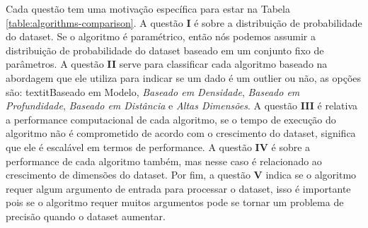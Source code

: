 Cada questão tem uma motivação específica para estar na Tabela \ref{table:algorithms-comparison}. A questão \textbf{I} é sobre a distribuição de probabilidade do dataset. Se o algoritmo é paramétrico, então nós podemos assumir a distribuição de probabilidade do dataset baseado em um conjunto fixo de parâmetros. A questão \textbf{II} serve para classificar cada algoritmo baseado na abordagem que ele utiliza para indicar se um dado é um outlier ou não, as opções são: textit{Baseado em Modelo}, \textit{Baseado em Densidade}, \textit{Baseado em Profundidade}, \textit{Baseado em Distância} e \textit{Altas Dimensões}. A questão \textbf{III} é relativa a performance computacional de cada algoritmo, se o tempo de execução do algoritmo não é comprometido de acordo com o crescimento do dataset, significa que ele é escalável em termos de performance. A questão \textbf{IV} é sobre a performance de cada algoritmo também, mas nesse caso é relacionado ao crescimento de dimensões do dataset. Por fim, a questão \textbf{V} indica se o algoritmo requer algum argumento de entrada para processar o dataset, isso é importante pois se o algoritmo requer muitos argumentos pode se tornar um problema de precisão quando o dataset aumentar.
